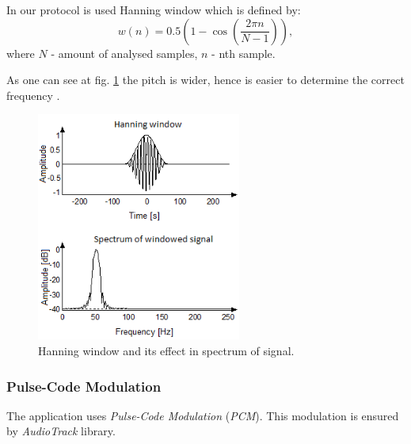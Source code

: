 \documentclass[11pt,titlepage]{article}
\theoremstyle{plain}
\begin{document}
\vspace{5mm}

In our protocol is used Hanning window which is defined by:
\begin{equation}
	 w(n) = 0.5 (1 - \cos\left(\frac{2 \pi n}{N - 1}\right)),
\end{equation}
\newline where $N$ - amount of analysed samples, $n$ - nth sample. 

\vspace{5mm}

As one can see at fig. \ref{fig:F10} the pitch is wider, hence is easier to determine the correct frequency \cite{hanning2}.
\begin{figure}[H]
	\centering
	\includegraphics[width=0.6\textwidth]{img/hanning_window}
	\caption{Hanning window and its effect in spectrum of signal.}
	\label{fig:F10}
\end{figure}

\subsubsection{Pulse-Code Modulation}
The application uses \textit{Pulse-Code Modulation} (\textit{PCM}). This modulation is ensured by \textit{AudioTrack} library.

\vspace{5mm}
\end{document}
